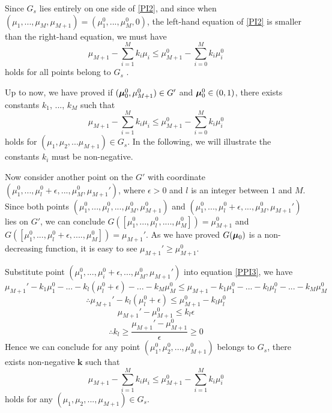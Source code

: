 Since $G_s$ lies entirely on one side of \eqref{PI2}, and since when $(\mu_1, ... ,\mu_M, \mu_{M+1})=(\mu_1^0, ..., \mu_M^0, 0)$, the left-hand equation of \eqref{PI2} is smaller than the right-hand equation, we must have 
\begin{equation}
\mu_{M+1} - \sum_{i=1}^{M}k_i\mu_i \leq \mu_{M+1}^0 - \sum_{i=0}^{M}k_i\mu_i^0
\label{PI3}
\end{equation}
holds for all points belong to $G_s$ \cite{dantzig1951fundamental}. 

Up to now, we have proved if  $(\boldsymbol{\mu}_0^0, \mu_{M+1}^0) \in G'$ and $\boldsymbol{\mu}_0^0 \in (0, 1)$, there exists constants $k_1$, ..., $k_M$ such that
\begin{equation}
\mu_{M+1} - \sum_{i=1}^{M}k_i\mu_i \leq \mu_{M+1}^0 - \sum_{i=0}^{M}k_i\mu_i^0
\label{PPI3}
\end{equation}
holds for  $(\mu_1, \mu_2, ...\mu_{M+1}) \in G_s$. In the following, we will illustrate the constants $k_i$ must be non-negative.   

Now consider another point on the $G'$ with coordinate $(\mu_1^0, ..., \mu_l^0+\epsilon, ..., \mu_M^0, \mu_{M+1}')$, where $\epsilon > 0$ and $l$ is an integer between $1$ and $M$.  Since both points $(\mu_1^0, ..., \mu_l^0, ..., \mu_M^0, \mu_{M+1}^0)$ and $(\mu_1^0, ..., \mu_l^0+\epsilon, ..., \mu_M^0, \mu_{M+1}')$ lies on $G'$, we can conclude $G([\mu_1^0, ..., \mu_l^0, ...., \mu_M^0]) = \mu_{M+1}^0$ and $G([\mu_1^0, ..., \mu_l^0 + \epsilon, ...., \mu_M^0]) = \mu_{M+1}'$. As we have proved $G(\boldsymbol{\mu}_0)$ is a non-decreasing function, it is easy to see $\mu_{M+1}' \geq \mu_{M+1}^0$.

Substitute point $(\mu_1^0, ..., \mu_i^0+\epsilon, ..., \mu_M^0, \mu_{M+1}')$  into equation \eqref{PPI3}, we have
\begin{equation}
\mu_{M+1}' - k_1\mu_1^0 - ... - k_l(\mu_l^0+\epsilon)- ... - k_M\mu_M^0 \leq \mu_{M+1} - k_1\mu_1^0 - ... - k_l\mu_l^0- ... - k_M\mu_M^0
\end{equation}
\begin{equation}
\therefore \mu_{M+1}' - k_l(\mu_l^0+\epsilon)\leq \mu_{M+1}^0 - k_l\mu_l^0
\end{equation}
\begin{equation}
\mu_{M+1}' - \mu_{M+1}^0 \leq k_l\epsilon
\end{equation}
\[
\therefore k_l \geq \frac{\mu_{M+1}' - \mu_{M+1}^0}{\epsilon} \geq 0
\]
Hence we can conclude for any point $(\mu_1^0, \mu_2^0, ..., \mu_{M+1}^0)$ belongs to $G_s$, there exists non-negative $\mathbf{k}$ such that 
\begin{equation}
\mu_{M+1} - \sum_{i=1}^{M}k_i\mu_i \leq \mu_{M+1}^0 - \sum_{i=1}^{M}k_i\mu_i^0
\end{equation}
holds for any $(\mu_1, \mu_2, ..., \mu_{M+1}) \in G_s$.

